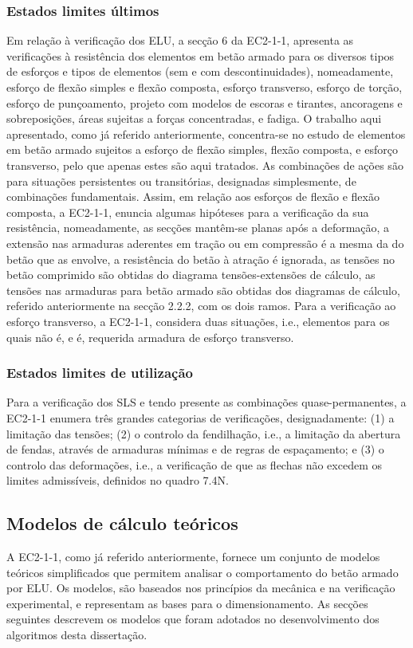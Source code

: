 \subsubsection{Estados limites últimos}
Em relação à verificação dos ELU, a secção 6 da EC2-1-1, apresenta as verificações à resistência dos elementos em betão armado para os diversos tipos de esforços e tipos de elementos (sem e com descontinuidades), nomeadamente, esforço de flexão simples e flexão composta, esforço transverso, esforço de torção, esforço de punçoamento, projeto com modelos de escoras e tirantes, ancoragens e sobreposições, áreas sujeitas a forças concentradas, e fadiga. 
O trabalho aqui apresentado, como já referido anteriormente, concentra-se no estudo de elementos em betão armado sujeitos a esforço de flexão simples, flexão composta, e esforço transverso, pelo que apenas estes são aqui tratados. As combinações de ações são para situações persistentes ou transitórias, designadas simplesmente, de combinações fundamentais. Assim, em relação aos esforços de flexão e flexão composta, a EC2-1-1, enuncia algumas hipóteses para a verificação da sua resistência, nomeadamente, as secções mantêm-se planas após a deformação, a extensão nas armaduras aderentes em tração ou em compressão é a mesma da do betão que as envolve, a resistência do betão à atração é ignorada, as tensões no betão comprimido são obtidas do diagrama tensões-extensões de cálculo, as tensões nas armaduras para betão armado são obtidas dos diagramas de cálculo, referido anteriormente na secção 2.2.2, com os dois ramos. Para a verificação ao esforço transverso, a EC2-1-1, considera duas situações, i.e., elementos para os quais não é, e é, requerida armadura de esforço transverso. 

\subsubsection{Estados limites de utilização}
Para a verificação dos SLS e tendo presente as combinações quase-permanentes, a EC2-1-1 enumera três grandes categorias de verificações, designadamente: (1) a limitação das tensões; (2) o controlo da fendilhação, i.e., a limitação da abertura de fendas, através de armaduras mínimas e de regras de espaçamento; e (3) o controlo das deformações, i.e., a verificação de que as flechas não excedem os limites admissíveis, definidos no quadro 7.4N.


\subsection{Modelos de cálculo teóricos}
A EC2-1-1, como já referido anteriormente, fornece um conjunto de modelos teóricos simplificados que permitem analisar o comportamento do betão armado por ELU. Os modelos, são baseados nos princípios da mecânica e na verificação experimental, e representam as bases para o dimensionamento. As secções seguintes descrevem os modelos que foram adotados no desenvolvimento dos algoritmos desta dissertação.

